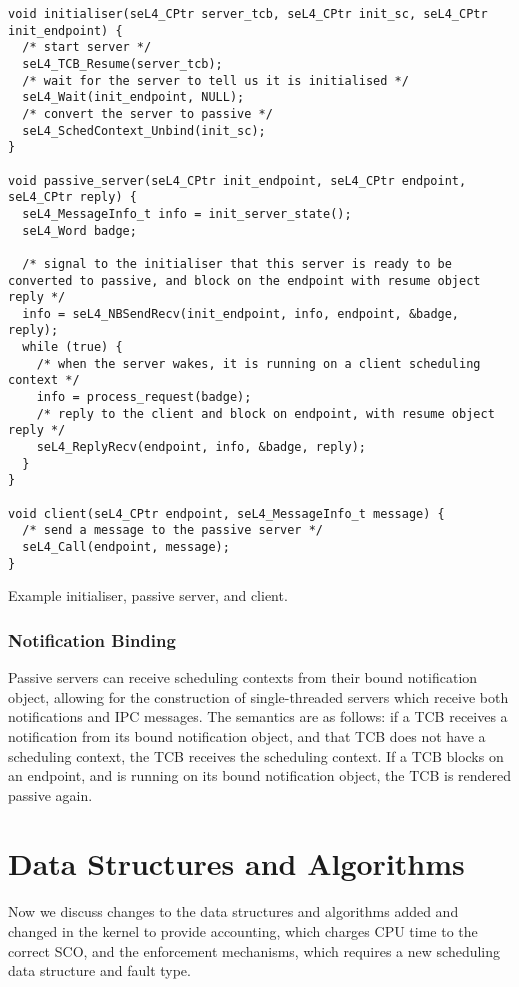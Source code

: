 \begin{listing}[t]
\begin{verbatim}
void initialiser(seL4_CPtr server_tcb, seL4_CPtr init_sc, seL4_CPtr init_endpoint) {
  /* start server */
  seL4_TCB_Resume(server_tcb);
  /* wait for the server to tell us it is initialised */
  seL4_Wait(init_endpoint, NULL);
  /* convert the server to passive */
  seL4_SchedContext_Unbind(init_sc);
}

void passive_server(seL4_CPtr init_endpoint, seL4_CPtr endpoint, seL4_CPtr reply) {  
  seL4_MessageInfo_t info = init_server_state();
  seL4_Word badge;

  /* signal to the initialiser that this server is ready to be converted to passive, and block on the endpoint with resume object reply */
  info = seL4_NBSendRecv(init_endpoint, info, endpoint, &badge, reply);
  while (true) {
    /* when the server wakes, it is running on a client scheduling context */
    info = process_request(badge);
    /* reply to the client and block on endpoint, with resume object reply */
    seL4_ReplyRecv(endpoint, info, &badge, reply);
  }
}

void client(seL4_CPtr endpoint, seL4_MessageInfo_t message) {
  /* send a message to the passive server */
  seL4_Call(endpoint, message);
}
\end{verbatim}
\caption{Example initialiser, passive server, and client.}
\label{list:passive-server}
\end{listing}

\subsubsection{Notification Binding}

Passive servers can receive scheduling contexts from their bound notification object, allowing for
the construction of single-threaded servers which receive both notifications and IPC messages. 
The semantics are as follows: if a TCB receives a notification from its bound notification
object, and that TCB does not have a scheduling context, the TCB receives the scheduling context.
If a TCB blocks on an endpoint, and is running on its bound notification object, the TCB is
rendered passive again. 

\section{Data Structures and Algorithms}

Now we discuss changes to the data structures and algorithms added and changed in the kernel to provide
accounting, which charges CPU time to the correct \gls{SCO}, and the enforcement mechanisms, which requires
a new scheduling data structure and fault type.

